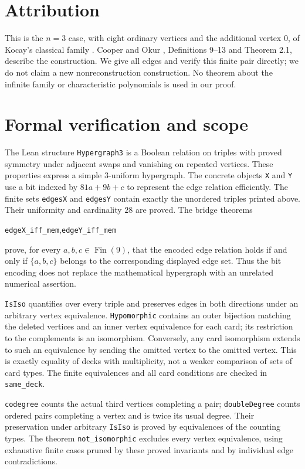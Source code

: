 \documentclass[11pt]{article}
\begin{document}
\section*{Attribution}
This is the $n=3$ case, with eight ordinary vertices and the additional
vertex $0$, of Kocay's classical family \cite{kocay}. Cooper and Okur
\cite{cooperokur}, Definitions 9--13 and Theorem 2.1, describe the
construction. We give all edges and verify this finite pair directly;
we do not claim a new nonreconstruction construction. No theorem about
the infinite family or characteristic polynomials is used in our proof.

\section*{Formal verification and scope}
The Lean structure \texttt{Hypergraph3} is a Boolean relation on triples
with proved symmetry under adjacent swaps and vanishing on repeated
vertices. These properties express a simple $3$-uniform hypergraph.
The concrete objects \texttt{X} and \texttt{Y} use a bit indexed by
$81a+9b+c$ to represent the edge relation efficiently. The finite sets
\texttt{edgesX} and \texttt{edgesY} contain exactly the unordered triples
printed above. Their uniformity and cardinality $28$ are proved.
The bridge theorems
\begin{center}
\texttt{edgeX\_iff\_mem},\qquad\texttt{edgeY\_iff\_mem}
\end{center}
prove, for every $a,b,c\in\operatorname{Fin}(9)$, that the encoded edge
relation holds if and only if $\{a,b,c\}$ belongs to the corresponding
displayed edge set. Thus the bit encoding does not replace the
mathematical hypergraph with an unrelated numerical assertion.

\texttt{IsIso} quantifies over every triple and preserves edges in both
directions under an arbitrary vertex equivalence. \texttt{Hypomorphic}
contains an outer bijection matching the deleted vertices and an inner
vertex equivalence for each card; its restriction to the complements is
an isomorphism. Conversely, any card isomorphism extends to such an
equivalence by sending the omitted vertex to the omitted vertex. This
is exactly equality of decks with multiplicity, not a weaker comparison
of sets of card types. The finite equivalences and all card conditions
are checked in \texttt{same\_deck}.

\texttt{codegree} counts the actual third vertices completing a pair;
\texttt{doubleDegree} counts ordered pairs completing a vertex and is
twice its usual degree. Their preservation under arbitrary
\texttt{IsIso} is proved by equivalences of the counting types.
The theorem \texttt{not\_isomorphic} excludes every vertex equivalence,
using exhaustive finite cases pruned by these proved invariants and
by individual edge contradictions.
\end{document}
